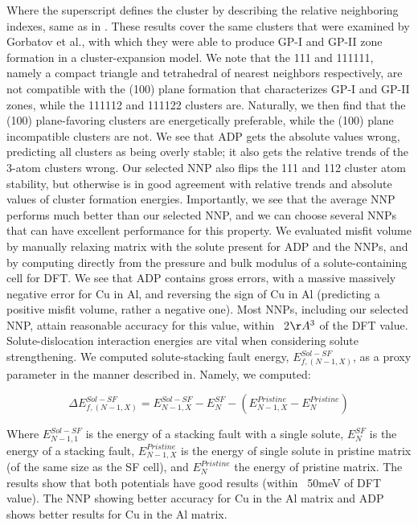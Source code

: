 \documentclass{article}
\begin{document}
Where the superscript defines the cluster by describing the relative neighboring indexes, same as in \cite{Gorbatov2019EffectiveAlloys}.
These results cover the same clusters that were examined by Gorbatov et al.\cite{Gorbatov2019EffectiveAlloys}, with which they were able to produce GP-I and GP-II zone formation in a cluster-expansion model.
We note that the 111 and 111111, namely a compact triangle and tetrahedral of nearest neighbors respectively, are not compatible with the (100) plane formation that characterizes GP-I and GP-II zones, while the 111112 and 111122 clusters are.
Naturally, we then find that the (100) plane-favoring clusters are energetically preferable, while the (100) plane incompatible clusters are not.
We see that ADP gets the absolute values wrong, predicting all clusters as being overly stable; it also gets the relative trends of the 3-atom clusters wrong.
Our selected NNP also flips the 111 and 112 cluster atom stability, but otherwise is in good agreement with relative trends and absolute values of cluster formation energies.
Importantly, we see that the average NNP performs much better than our selected NNP, and we can choose several NNPs that can have excellent performance for this property. 
We evaluated misfit volume by manually relaxing matrix with the solute present for ADP and the NNPs, and by computing directly from the pressure and bulk modulus of a solute-containing cell for DFT.
We see that ADP contains gross errors, with a massive massively negative error for Cu in Al, and reversing the sign of Cu in Al (predicting a positive misfit volume, rather a negative one).
Most NNPs, including our selected NNP, attain reasonable accuracy for this value, within ~2$\AA^3$ of the DFT value. 
Solute-dislocation interaction energies are vital when considering solute strengthening\cite{Leyson2010}.
We computed solute-stacking fault energy, $E^{Sol-SF}_{f,(N-1,X)}$, as a proxy parameter in the manner described in\cite{Yin2017a}.
Namely, we computed:

\begin{equation}
\Delta E^{Sol-SF}_{f,(N-1,X)} = E^{Sol-SF}_{N-1,X} - E^{SF}_{N} - (E^{Pristine}_{N-1,X}-E^{Pristine}_{N})
\end{equation}

Where $E^{Sol-SF}_{N-1,1}$ is the energy of a stacking fault with a single solute,
$E^{SF}_{N}$ is the energy of a stacking fault,
$E^{Pristine}_{N-1,X}$ is the energy of single solute in pristine matrix (of the same size as the SF cell), 
and $E^{Pristine}_{N}$ the energy of pristine matrix. 
The results show that both potentials have good results (within ~50meV of DFT value).
The NNP showing better accuracy for Cu in the Al matrix and ADP shows better results for Cu in the Al matrix.
\end{document}
